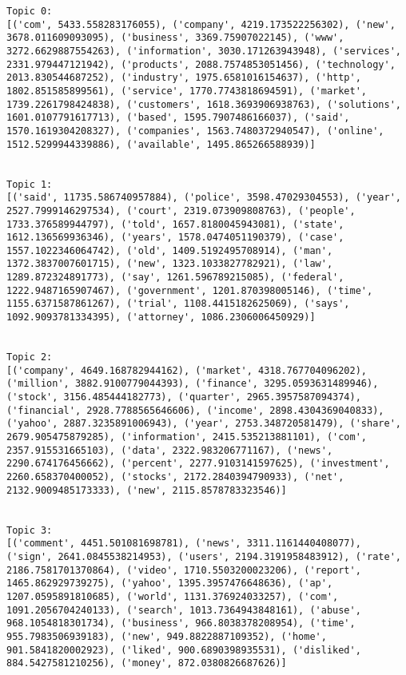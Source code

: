 \documentclass[11pt]{article}
\begin{document}
    \begin{Verbatim}[commandchars=\\\{\}]
Topic 0:
[('com', 5433.558283176055), ('company', 4219.173522256302), ('new', 3678.011609093095), ('business', 3369.75907022145), ('www', 3272.6629887554263), ('information', 3030.171263943948), ('services', 2331.979447121942), ('products', 2088.7574853051456), ('technology', 2013.830544687252), ('industry', 1975.6581016154637), ('http', 1802.851585899561), ('service', 1770.7743818694591), ('market', 1739.2261798424838), ('customers', 1618.3693906938763), ('solutions', 1601.0107791617713), ('based', 1595.7907486166037), ('said', 1570.1619304208327), ('companies', 1563.7480372940547), ('online', 1512.5299944339886), ('available', 1495.865266588939)]


Topic 1:
[('said', 11735.586740957884), ('police', 3598.47029304553), ('year', 2527.7999146297534), ('court', 2319.073909808763), ('people', 1733.376589944797), ('told', 1657.8180045943081), ('state', 1612.136569936346), ('years', 1578.0474051190379), ('case', 1557.1022346064742), ('old', 1409.5192495708914), ('man', 1372.3837007601715), ('new', 1323.1033827782921), ('law', 1289.872324891773), ('say', 1261.596789215085), ('federal', 1222.9487165907467), ('government', 1201.870398005146), ('time', 1155.6371587861267), ('trial', 1108.4415182625069), ('says', 1092.9093781334395), ('attorney', 1086.2306006450929)]


Topic 2:
[('company', 4649.168782944162), ('market', 4318.767704096202), ('million', 3882.9100779044393), ('finance', 3295.0593631489946), ('stock', 3156.485444182773), ('quarter', 2965.3957587094374), ('financial', 2928.7788565646606), ('income', 2898.4304369040833), ('yahoo', 2887.3235891006943), ('year', 2753.348720581479), ('share', 2679.905475879285), ('information', 2415.535213881101), ('com', 2357.915531665103), ('data', 2322.983206771167), ('news', 2290.674176456662), ('percent', 2277.9103141597625), ('investment', 2260.658370400052), ('stocks', 2172.2840394790933), ('net', 2132.9009485173333), ('new', 2115.8578783323546)]


Topic 3:
[('comment', 4451.501081698781), ('news', 3311.1161440408077), ('sign', 2641.0845538214953), ('users', 2194.3191958483912), ('rate', 2186.7581701370864), ('video', 1710.5503200023206), ('report', 1465.862929739275), ('yahoo', 1395.3957476648636), ('ap', 1207.0595891810685), ('world', 1131.376924033257), ('com', 1091.2056704240133), ('search', 1013.7364943848161), ('abuse', 968.1054818301734), ('business', 966.8038378208954), ('time', 955.7983506939183), ('new', 949.8822887109352), ('home', 901.5841820002923), ('liked', 900.6890398935531), ('disliked', 884.5427581210256), ('money', 872.0380826687626)]



    \end{Verbatim}
\end{document}
